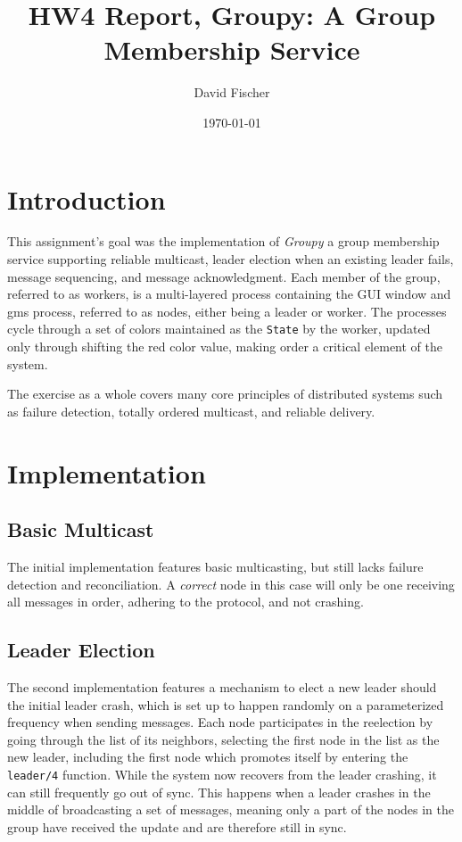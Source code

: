 \documentclass[a4paper, 11pt]{article}
\title{HW4 Report, Groupy: A Group Membership Service}
\author{David Fischer}
\date{\today{}}
\begin{document}
\maketitle

\section{Introduction}

This assignment's goal was the implementation of \textit{Groupy} a group membership service supporting reliable multicast, leader election when an existing leader fails, message sequencing, and message acknowledgment.
Each member of the group, referred to as workers, is a multi-layered process containing the GUI window and gms process, referred to as nodes, either being a leader or worker. The processes cycle through a set of colors maintained as the \texttt{State} by the worker, updated only through shifting the red color value, making order a critical element of the system.

The exercise as a whole covers many core principles of distributed systems such as failure detection, totally ordered multicast, and reliable delivery.

\section{Implementation}

\subsection{Basic Multicast}

The initial implementation features basic multicasting, but still lacks failure detection and reconciliation. A \textit{correct} node in this case will only be one receiving all messages in order, adhering to the protocol, and not crashing.


\subsection{Leader Election}

The second implementation features a mechanism to elect a new leader should the initial leader crash, which is set up to happen randomly on a parameterized frequency when sending messages.
Each node participates in the reelection by going through the list of its neighbors, selecting the first node in the list as the new leader, including the first node which promotes itself by entering the \texttt{leader/4} function.
While the system now recovers from the leader crashing, it can still frequently go out of sync. This happens when a leader crashes in the middle of broadcasting a set of messages,
meaning only a part of the nodes in the group have received the update and are therefore still in sync.
\end{document}
